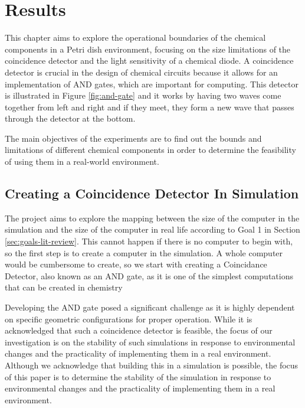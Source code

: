 
\chapter{Results} \label{ch:results}
This chapter aims to explore the operational boundaries of the chemical components in a Petri dish environment, focusing on the size limitations of the coincidence detector and the light sensitivity of a chemical diode.
A coincidence detector is crucial in the design of chemical circuits because it allows for an implementation of AND gates,
which are important for computing. This detector is illustrated in Figure \ref{fig:and-gate} and it works by having two waves come together from left and right and if they meet, they form a new wave that passes through the detector at the bottom.

The main objectives of the experiments are to find out the bounds and limitations of different chemical components in order to determine the feasibility of using them in a real-world environment.

\section{Creating a Coincidence Detector In Simulation} \label{chap:creating-detector}
The project aims to explore the mapping between the size of the computer in the simulation and the size of the computer in real life
according to Goal 1 in Section \ref{sec:goals-lit-review}. This cannot happen if there is no computer to begin with, so the first step is to create a computer in the simulation.
A whole computer would be cumbersome to create, so we start with creating a Coincidance Detector, also known as an AND gate, as it is one of the simplest computations that can be created in chemistry

Developing the AND gate posed a significant challenge as it is highly dependent on specific geometric configurations for proper operation. 
While it is acknowledged that such a coincidence detector is feasible, the focus of our investigation is on the stability of such simulations in response to environmental changes and the practicality of implementing them in a real environment.
Although we acknowledge that building this in a simulation is possible, the focus of this paper is to determine the stability of the simulation in response to environmental changes and the practicality of implementing them in a real environment. 


